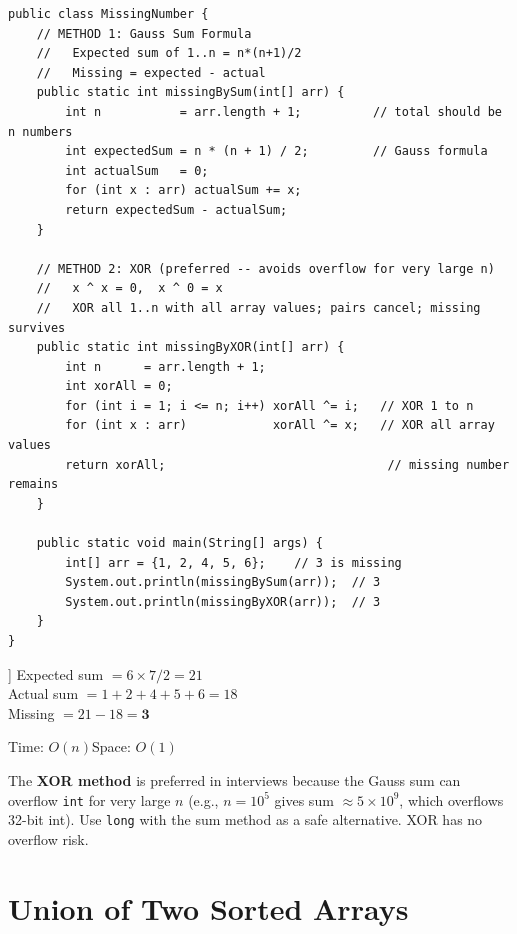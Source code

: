 \documentclass[12pt,a4paper,oneside]{book}
\begin{document}
\begin{lstlisting}[caption={Missing Number --- Sum Formula and XOR (both shown)}]
public class MissingNumber {
    // METHOD 1: Gauss Sum Formula
    //   Expected sum of 1..n = n*(n+1)/2
    //   Missing = expected - actual
    public static int missingBySum(int[] arr) {
        int n           = arr.length + 1;          // total should be n numbers
        int expectedSum = n * (n + 1) / 2;         // Gauss formula
        int actualSum   = 0;
        for (int x : arr) actualSum += x;
        return expectedSum - actualSum;
    }

    // METHOD 2: XOR (preferred -- avoids overflow for very large n)
    //   x ^ x = 0,  x ^ 0 = x
    //   XOR all 1..n with all array values; pairs cancel; missing survives
    public static int missingByXOR(int[] arr) {
        int n      = arr.length + 1;
        int xorAll = 0;
        for (int i = 1; i <= n; i++) xorAll ^= i;   // XOR 1 to n
        for (int x : arr)            xorAll ^= x;   // XOR all array values
        return xorAll;                               // missing number remains
    }

    public static void main(String[] args) {
        int[] arr = {1, 2, 4, 5, 6};    // 3 is missing
        System.out.println(missingBySum(arr));  // 3
        System.out.println(missingByXOR(arr));  // 3
    }
}
\end{lstlisting}

\begin{dryrun}[Sum Method: arr = \{1, 2, 4, 5, 6\}, range [1..6]]
Expected sum $= 6 \times 7 / 2 = 21$\\
Actual sum $= 1 + 2 + 4 + 5 + 6 = 18$\\
Missing $= 21 - 18 = \mathbf{3}$
\end{dryrun}

\begin{complexity}
Time: $O(n)$\quad Space: $O(1)$
\end{complexity}

\begin{interviewcorner}
The \textbf{XOR method} is preferred in interviews because the Gauss sum can overflow \texttt{int} for very large $n$ (e.g., $n = 10^5$ gives sum $\approx 5 \times 10^{9}$, which overflows 32-bit int). Use \texttt{long} with the sum method as a safe alternative. XOR has no overflow risk.
\end{interviewcorner}

\section{Union of Two Sorted Arrays}
\end{document}
